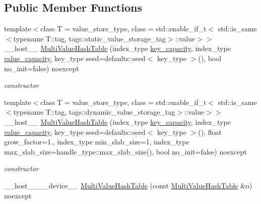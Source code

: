 \subsection*{Public Member Functions}
\begin{DoxyCompactItemize}
\item 
{\footnotesize template$<$class T  = value\+\_\+store\+\_\+type, class  = std\+::enable\+\_\+if\+\_\+t$<$            std\+::is\+\_\+same$<$typename T\+::tag, tags\+::static\+\_\+value\+\_\+storage\+\_\+tag$>$\+::value$>$$>$ }\\\+\_\+\+\_\+host\+\_\+\+\_\+ \hyperlink{classwarpcore_1_1MultiValueHashTable_addc8eff5737fc71abef7a193d89b4285}{Multi\+Value\+Hash\+Table} (index\+\_\+type \hyperlink{classwarpcore_1_1MultiValueHashTable_aabaa179a3e1b49f37f1a23adb0b33092}{key\+\_\+capacity}, index\+\_\+type \hyperlink{classwarpcore_1_1MultiValueHashTable_a5e5959606f5446959d56758b957626fa}{value\+\_\+capacity}, key\+\_\+type seed=defaults\+::seed$<$ key\+\_\+type $>$(), bool no\+\_\+init=false) noexcept
\begin{DoxyCompactList}\small\item\em constructor \end{DoxyCompactList}\item 
{\footnotesize template$<$class T  = value\+\_\+store\+\_\+type, class  = std\+::enable\+\_\+if\+\_\+t$<$            std\+::is\+\_\+same$<$typename T\+::tag, tags\+::dynamic\+\_\+value\+\_\+storage\+\_\+tag$>$\+::value$>$$>$ }\\\+\_\+\+\_\+host\+\_\+\+\_\+ \hyperlink{classwarpcore_1_1MultiValueHashTable_a6e21c9a883a3641d0dece3b9f9e9def0}{Multi\+Value\+Hash\+Table} (index\+\_\+type \hyperlink{classwarpcore_1_1MultiValueHashTable_aabaa179a3e1b49f37f1a23adb0b33092}{key\+\_\+capacity}, index\+\_\+type \hyperlink{classwarpcore_1_1MultiValueHashTable_a5e5959606f5446959d56758b957626fa}{value\+\_\+capacity}, key\+\_\+type seed=defaults\+::seed$<$ key\+\_\+type $>$(), float grow\+\_\+factor=1., index\+\_\+type min\+\_\+slab\+\_\+size=1, index\+\_\+type max\+\_\+slab\+\_\+size=handle\+\_\+type\+::max\+\_\+slab\+\_\+size(), bool no\+\_\+init=false) noexcept
\begin{DoxyCompactList}\small\item\em constructor \end{DoxyCompactList}\item 
\+\_\+\+\_\+host\+\_\+\+\_\+\+\_\+\+\_\+device\+\_\+\+\_\+ \hyperlink{classwarpcore_1_1MultiValueHashTable_a0ceda8a86a7321549fffbf49d921fe79}{Multi\+Value\+Hash\+Table} (const \hyperlink{classwarpcore_1_1MultiValueHashTable}{Multi\+Value\+Hash\+Table} \&o) noexcept

\end{DoxyCompactItemize}
